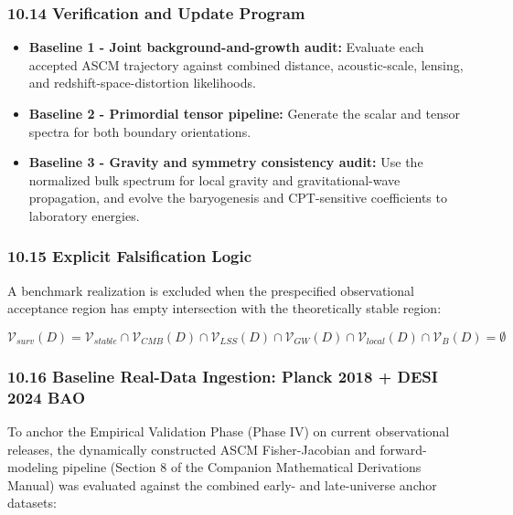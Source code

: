 \documentclass[aps,prd,onecolumn,superscriptaddress,nofootinbib,longbibliography,10pt]{revtex4-2}
\begin{document}
  
\subsubsection*{10.14 Verification and Update Program}

  
\begin{itemize}
    
\item \textbf{Baseline 1 - Joint background-and-growth audit:} Evaluate each accepted ASCM trajectory against combined distance, acoustic-scale, lensing, and redshift-space-distortion likelihoods.
    
\item \textbf{Baseline 2 - Primordial tensor pipeline:} Generate the scalar and tensor spectra for both boundary orientations.
    
\item \textbf{Baseline 3 - Gravity and symmetry consistency audit:} Use the normalized bulk spectrum for local gravity and gravitational-wave propagation, and evolve the baryogenesis and CPT-sensitive coefficients to laboratory energies.
  
\end{itemize}


  
\subsubsection*{10.15 Explicit Falsification Logic}

  A benchmark realization is excluded when the prespecified observational acceptance region has empty intersection with the theoretically stable region:


  \[ \mathcal{V}_{surv}(D) = \mathcal{V}_{stable} \cap \mathcal{V}_{CMB}(D) \cap \mathcal{V}_{LSS}(D) \cap \mathcal{V}_{GW}(D) \cap \mathcal{V}_{local}(D) \cap \mathcal{V}_B(D) = \emptyset \]

  
\subsubsection*{10.16 Baseline Real-Data Ingestion: Planck 2018 + DESI 2024 BAO}

  To anchor the Empirical Validation Phase (Phase IV) on current observational releases, the dynamically constructed ASCM Fisher-Jacobian and forward-modeling pipeline (Section 8 of the Companion Mathematical Derivations Manual) was evaluated against the combined early- and late-universe anchor datasets:
\end{document}
